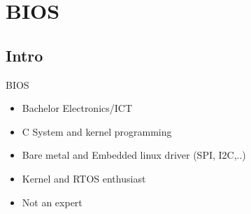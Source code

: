 \documentclass[11pt]{beamer}
\begin{document}
\section{BIOS}
\subsection{Intro}
\begin{frame}{BIOS}
\begin{itemize}
\item Bachelor Electronics/ICT
\item C System and kernel programming
\item Bare metal and Embedded linux driver (SPI, I2C,..)
\item Kernel and RTOS enthusiast
\item Not an expert
\end{itemize}
\end{frame}
\end{document}
